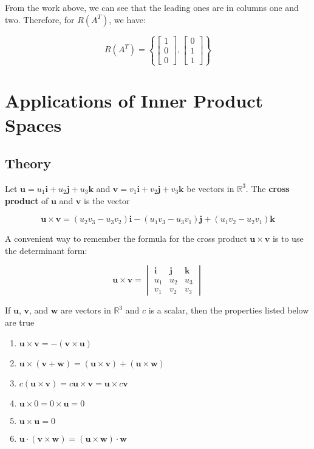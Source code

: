 \documentclass{report}
\begin{document}
From the work above, we can see that the leading ones are in columns one and two. Therefore, for $R(A^T)$, we have:

$$
R(A^T) = \left\{ \begin{bmatrix} 1 \\ 0 \\ 0 \end{bmatrix}, \begin{bmatrix}
	 0 \\ 1 \\ 1 \end{bmatrix} \right\}
$$

\section{Applications of Inner Product Spaces}

\subsection{Theory}

\begin{tcolorbox}[title = Definition of the Cross Product of Two Vectors]
	Let $\bm{u} = u_1 \bm{i} + u_2 \bm{j} + u_3 \bm{k}$ and $\bm{v} = v_1 \bm{i} + v_2 \bm{j} + v_3 \bm{k}$ be vectors in $\mathbb{R}^3$. The \textbf{cross product} of $\bm{u}$ and $\bm{v}$ is the vector
	
	$$
	\bm{u} \times \bm{v} = (u_2 v_3 - u_3v_2) \bm{i} - (u_1 v_3 - u_3 v_1) \bm{j} + (u_1 v_2 - u_2 v_1) \bm{k}
	$$
	
	A convenient way to remember the formula for the cross product $\bm{u} \times \bm{v}$ is to use the determinant form:
	
	$$
	\bm{u} \times \bm{v} = \begin{vmatrix} \bm{i} & \bm{j} & \bm{k} \\ u_1 & u_2 & u_3 \\ v_1 & v_2 & v_3 \end{vmatrix}
	$$
\end{tcolorbox}

\begin{tcolorbox}[title = Algebraic Properties of the Cross Product]
	If $\bm{u}$, $\bm{v}$, and $\bm{w}$ are vectors in $\mathbb{R}^3$ and $c$ is a scalar, then the properties listed below are true
	\begin{enumerate}
		\item $\bm{u} \times \bm{v} = - (\bm{v} \times \bm{u})$
		\item $\bm{u} \times (\bm{v} + \bm{w}) = (\bm{u} \times \bm{v}) + (\bm{u} \times \bm{w})$
		\item $c(\bm{u} \times \bm{v}) = c\bm{u} \times \bm{v} = \bm{u} \times c\bm{v}$
		\item $\bm{u} \times 0 = 0 \times \bm{u} = 0$
		\item $\bm{u} \times \bm{u} = 0$
		\item $\bm{u} \cdot (\bm{v} \times \bm{w}) = (\bm{u} \times \bm{w}) \cdot \bm{w}$
	\end{enumerate}
\end{tcolorbox}
\end{document}
